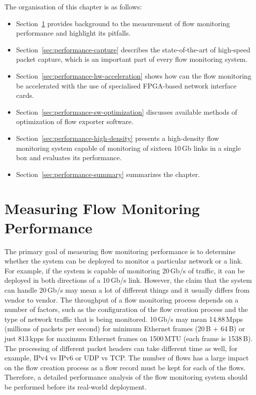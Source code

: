 \begin{chapintro}
The organisation of this chapter is as follows:
\begin{itemize}
  \item Section~\ref{sec:performance-measurement} provides background to the measurement of flow monitoring performance and highlight its pitfalls.
  \item Section~\ref{sec:performance-capture} describes the state-of-the-art of high-speed packet capture, which is an important part of every flow monitoring system.
  \item Section~\ref{sec:performance-hw-acceleration} shows how can the flow monitoring be accelerated with the use of specialised FPGA-based network interface cards.
  \item Section~\ref{sec:performance-sw-optimization} discusses available methods of optimization of flow exporter software.
  \item Section~\ref{sec:performance-high-density} presents a high-density flow monitoring system capable of monitoring of sixteen 10\,Gb links in a single box and evaluates its performance.
  \item Section~\ref{sec:performance-summary} summarizes the chapter.
\end{itemize}

\end{chapintro}

\newpage


\section{Measuring Flow Monitoring Performance}\label{sec:performance-measurement}

The primary goal of measuring flow monitoring performance is to determine whether the system can be deployed to monitor a particular network or a link. For example, if the system is capable of monitoring 20\,Gb/s of traffic, it can be deployed in both directions of a 10\,Gb/s link. However, the claim that the system can handle 20\,Gb/s may mean a lot of different things and it usually differs from vendor to vendor. The throughput of a flow monitoring process depends on a number of factors, such as the configuration of the flow creation process and the type of network traffic that is being monitored. 10\,Gb/s may mean 14.88\,Mpps (millions of packets per second) for minimum Ethernet frames (20\,B + 64\,B) or just 813\,kpps for maximum Ethernet frames on 1500\,MTU (each frame is 1538\,B). The processing of different packet headers can take different time as well, for example, IPv4 vs IPv6 or UDP vs TCP. The number of flows has a large impact on the flow creation process as a flow record must be kept for each of the flows. Therefore, a detailed performance analysis of the flow monitoring system should be performed before its real-world deployment.

